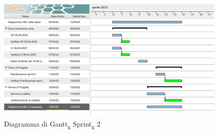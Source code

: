 \begin{figure}[H]
	\centering 
	\includegraphics[scale=0.42]{image/gantt_sprint2.PNG}
	\caption{Diagramma di Gantt\textsubscript{g} Sprint\textsubscript{g} 2}
\end{figure}
\pagebreak